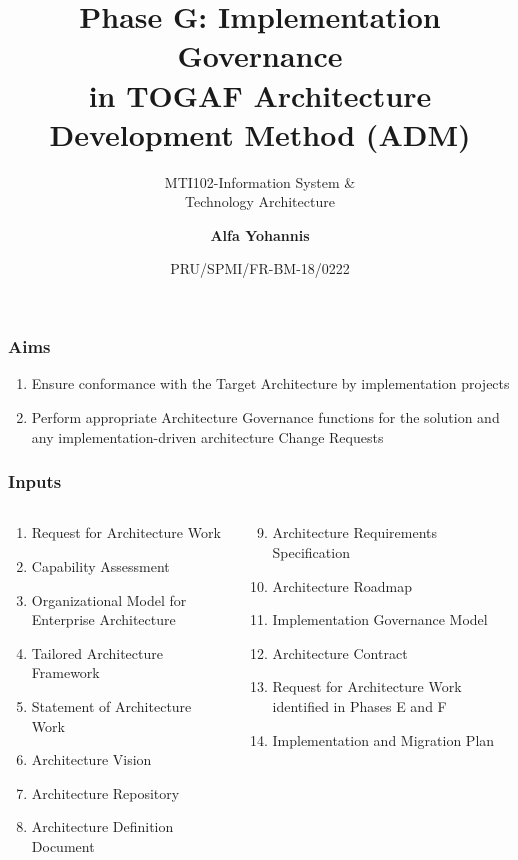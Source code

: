\documentclass[aspectratio=169, table]{beamer}
\subtitle{MTI102-Information System \&\\Technology Architecture}
\title{\Large Phase G: Implementation Governance\\in TOGAF
	Architecture\\Development Method (ADM)}
\date[Serial]{\scriptsize {PRU/SPMI/FR-BM-18/0222}}
\author[Pradita]{\small {\textbf{Alfa Yohannis}}}
\begin{document}
	
	\frame{\titlepage}
	
	\begin{frame}
		\frametitle{Aims}
		\begin{enumerate}
			\item Ensure conformance with the Target Architecture by implementation projects
			\item Perform appropriate Architecture Governance functions for the solution and any implementation-driven architecture Change Requests
		\end{enumerate}	
	\end{frame}
	
	\begin{frame}
		\frametitle{Inputs}
		\vspace{22pt}
		\begin{columns}[onlytextwidth]
			\begin{column}{0.5\textwidth}
				\begin{enumerate}
					\item Request for Architecture Work
					\item Capability Assessment
					\item Organizational Model for Enterprise Architecture
					\item Tailored Architecture Framework
					\item Statement of Architecture Work
					\item Architecture Vision
					\item Architecture Repository
					\item Architecture Definition Document
					
				\end{enumerate}
				
			\end{column}
			\begin{column}{0.5\textwidth}
				\begin{enumerate}
					\setcounter{enumi}{8}
					\item Architecture Requirements Specification
					\item Architecture Roadmap
					\item Implementation Governance Model
					\item Architecture Contract
					\item Request for Architecture Work identified in Phases E and F
					\item Implementation and Migration Plan
				\end{enumerate}
			\end{column}
		\end{columns}
	\end{frame}
	
\end{document}
